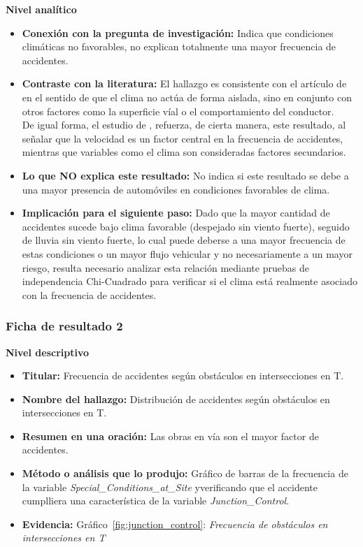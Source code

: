\documentclass[12pt]{article}
\begin{document}
\textbf{Nivel analítico}
\begin{itemize}
    \item \textbf{Conexión con la pregunta de investigación:} Indica que condiciones climáticas
    no favorables, no explican totalmente una mayor frecuencia de accidentes.

    \item \textbf{Contraste con la literatura:} El hallazgo es consistente con el artículo de
    \textcite{KARZAN2017} en el sentido de que el clima no actúa de forma aislada, sino en 
    conjunto con otros factores como la superficie víal o el comportamiento del conductor.\\
    De igual forma, el estudio de \textcite{TAYLOR2000}, refuerza, de cierta manera, este resultado,
    al señalar que la velocidad es un factor central en la frecuencia de accidentes, mientras que
    variables como el clima son consideradas factores secundarios.

    \item \textbf{Lo que NO explica este resultado:} No indica si este resultado se debe a una mayor
    presencia de automóviles en condiciones favorables de clima.

    \item \textbf{Implicación para el siguiente paso:} Dado que la mayor cantidad de accidentes sucede
    bajo clima favorable (despejado sin viento fuerte), seguido de lluvia sin viento fuerte, lo cual
    puede deberse a una mayor frecuencia de estas condiciones o un mayor flujo vehicular y no necesariamente
    a un mayor riesgo, resulta necesario analizar esta relación mediante pruebas de independencia Chi-Cuadrado
    para verificar si el clima está realmente asociado con la frecuencia de accidentes.
\end{itemize}


\subsubsection{Ficha de resultado 2}
\textbf{Nivel descriptivo}
\begin{itemize}
    \item \textbf{Titular:} Frecuencia de accidentes según obstáculos en intersecciones en T.

    \item \textbf{Nombre del hallazgo:} Distribución de accidentes según obstáculos en intersecciones en T.

    \item \textbf{Resumen en una oración:} Las obras en vía son el mayor factor de accidentes.

    \item \textbf{Método o análisis que lo produjo:} Gráfico de barras de la frecuencia de la variable \textit{Special\_Conditions\_at\_Site} 
    yverificando que el accidente cumplliera una característica de la variable \textit{Junction\_Control}.

    \item \textbf{Evidencia:} Gráfico~\ref{fig:junction_control}: \textit{Frecuencia de obstáculos en intersecciones en T} \\
\end{itemize} 
\end{document}
